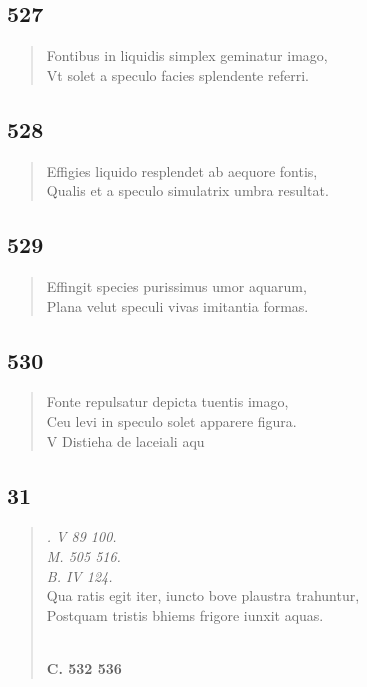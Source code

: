 \documentclass[11pt, a4paper]{report}
\begin{document}
            \subsection*{527}
      \begin{verse}
      Fontibus in liquidis simplex geminatur imago, \\ Vt solet a speculo facies splendente referri. \\ 
      \end{verse}
  
            \subsection*{528}
      \begin{verse}
      Effigies liquido resplendet ab aequore fontis, \\ Qualis et a speculo simulatrix umbra resultat. \\ 
      \end{verse}
  
            \subsection*{529}
      \begin{verse}
      Effingit species purissimus umor aquarum, \\ Plana velut speculi vivas imitantia formas. \\ 
      \end{verse}
  
            \subsection*{530}
      \begin{verse}
      Fonte repulsatur depicta tuentis imago, \\ Ceu levi in speculo solet apparere figura. \\ V Distieha de laceiali aqu \\ 
      \end{verse}
  
            \subsection*{31}
      \begin{verse}
      \textit{. V 89 100.} \\ \textit{M. 505 516.} \\ \textit{B. IV 124.} \\ Qua ratis egit iter, iuncto bove plaustra trahuntur, \\ Postquam tristis bhiems frigore iunxit aquas. \\ 
        ﻿\pagebreak 
    \begin{center} \textbf{C. 532 536} \end{center} \marginpar{[67]} 
      \end{verse}
  
\end{document}
